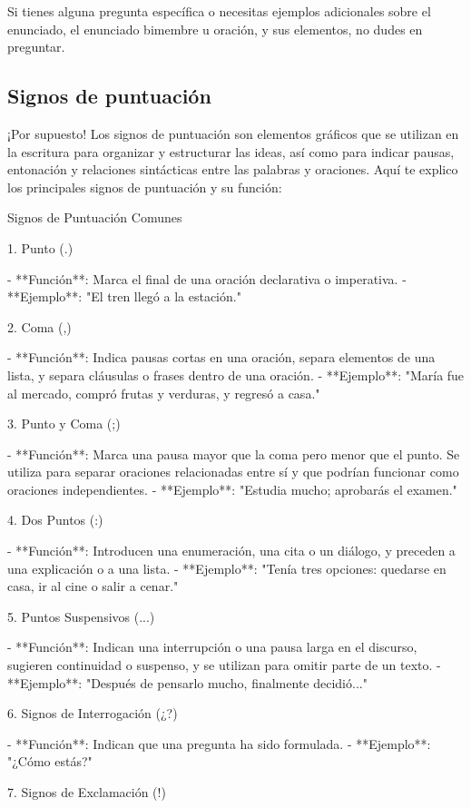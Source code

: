 Si tienes alguna pregunta específica o necesitas ejemplos adicionales sobre el enunciado, el enunciado bimembre u oración, y sus elementos, no dudes en preguntar.

\subsection{Signos de puntuación}

¡Por supuesto! Los signos de puntuación son elementos gráficos que se utilizan en la escritura para organizar y estructurar las ideas, así como para indicar pausas, entonación y relaciones sintácticas entre las palabras y oraciones. Aquí te explico los principales signos de puntuación y su función:

Signos de Puntuación Comunes

1. Punto (.)

- **Función**: Marca el final de una oración declarativa o imperativa.
- **Ejemplo**: "El tren llegó a la estación."

2. Coma (,)

- **Función**: Indica pausas cortas en una oración, separa elementos de una lista, y separa cláusulas o frases dentro de una oración.
- **Ejemplo**: "María fue al mercado, compró frutas y verduras, y regresó a casa."

3. Punto y Coma (;)

- **Función**: Marca una pausa mayor que la coma pero menor que el punto. Se utiliza para separar oraciones relacionadas entre sí y que podrían funcionar como oraciones independientes.
- **Ejemplo**: "Estudia mucho; aprobarás el examen."

4. Dos Puntos (:)

- **Función**: Introducen una enumeración, una cita o un diálogo, y preceden a una explicación o a una lista.
- **Ejemplo**: "Tenía tres opciones: quedarse en casa, ir al cine o salir a cenar."

5. Puntos Suspensivos (...)

- **Función**: Indican una interrupción o una pausa larga en el discurso, sugieren continuidad o suspenso, y se utilizan para omitir parte de un texto.
- **Ejemplo**: "Después de pensarlo mucho, finalmente decidió..."

6. Signos de Interrogación (¿?)

- **Función**: Indican que una pregunta ha sido formulada.
- **Ejemplo**: "¿Cómo estás?"

7. Signos de Exclamación (!)

